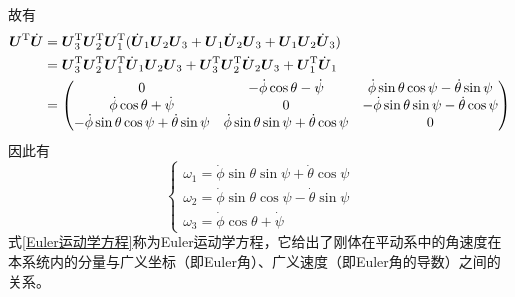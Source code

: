 故有
\begin{align*}
	\boldsymbol{U}^{\mathrm{T}} \dot{\boldsymbol{U}} & = \boldsymbol{U}_3^{\mathrm{T}} \boldsymbol{U}_2^{\mathrm{T}} \boldsymbol{U}_1^{\mathrm{T}} (\dot{\boldsymbol{U}}_1 \boldsymbol{U}_2 \boldsymbol{U}_3 + \boldsymbol{U}_1 \dot{\boldsymbol{U}}_2 \boldsymbol{U}_3 + \boldsymbol{U}_1 \boldsymbol{U}_2 \dot{\boldsymbol{U}}_3) \\
	& = \boldsymbol{U}_3^{\mathrm{T}} \boldsymbol{U}_2^{\mathrm{T}} \boldsymbol{U}_1^{\mathrm{T}} \dot{\boldsymbol{U}}_1 \boldsymbol{U}_2 \boldsymbol{U}_3 + \boldsymbol{U}_3^{\mathrm{T}} \boldsymbol{U}_2^{\mathrm{T}} \dot{\boldsymbol{U}}_2 \boldsymbol{U}_3 + \boldsymbol{U}_1^{\mathrm{T}} \dot{\boldsymbol{U}}_1 \\
	& = \begin{pmatrix}
		0 & -\dot{\phi} \cos \theta - \dot{\psi} & \dot{\phi} \sin \theta \cos \psi - \dot{\theta} \sin \psi \\
		\dot{\phi} \cos \theta + \dot{\psi} & 0 & -\dot{\phi} \sin \theta \sin \psi - \dot{\theta} \cos \psi \\
		- \dot{\phi} \sin \theta \cos \psi + \dot{\theta} \sin \psi & \dot{\phi} \sin \theta \sin \psi + \dot{\theta} \cos \psi & 0
	\end{pmatrix}
\end{align*}
因此有
\begin{equation}
	\begin{cases}
		\omega_1 = \dot{\phi} \sin \theta \sin \psi + \dot{\theta} \cos \psi \\
		\omega_2 = \dot{\phi} \sin \theta \cos \psi - \dot{\theta} \sin \psi \\
		\omega_3 = \dot{\phi} \cos \theta + \dot{\psi}
	\end{cases}
	\label{Euler运动学方程}
\end{equation}
式\eqref{Euler运动学方程}称为{\heiti Euler运动学方程}，它给出了刚体在平动系中的角速度在本系统内的分量与广义坐标（即Euler角）、广义速度（即Euler角的导数）之间的关系。

